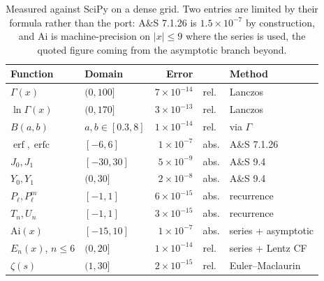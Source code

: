\documentclass[11pt,a4paper]{article}
\theoremstyle{plain}
\theoremstyle{definition}
\begin{document}
\begin{table}[h]
\centering\footnotesize
\begin{tabular}{@{}llrll@{}}
\toprule
\textbf{Function} & \textbf{Domain} & \textbf{Error} & & \textbf{Method}\\
\midrule
$\Gamma(x)$ & $(0,100]$ & $7\times10^{-14}$ & rel. & Lanczos\\
$\ln\Gamma(x)$ & $(0,170]$ & $3\times10^{-13}$ & rel. & Lanczos\\
$B(a,b)$ & $a,b\in[0.3,8]$ & $1\times10^{-14}$ & rel. & via $\Gamma$\\
$\operatorname{erf},\operatorname{erfc}$ & $[-6,6]$ & $1\times10^{-7}$ & abs. & A\&S 7.1.26\\
$J_0,J_1$ & $[-30,30]$ & $5\times10^{-9}$ & abs. & A\&S 9.4\\
$Y_0,Y_1$ & $(0,30]$ & $2\times10^{-8}$ & abs. & A\&S 9.4\\
$P_\ell,P_\ell^m$ & $[-1,1]$ & $6\times10^{-15}$ & abs. & recurrence\\
$T_n,U_n$ & $[-1,1]$ & $3\times10^{-15}$ & abs. & recurrence\\
$\mathrm{Ai}(x)$ & $[-15,10]$ & $1\times10^{-7}$ & abs. & series + asymptotic\\
$E_n(x)$, $n\le6$ & $(0,20]$ & $1\times10^{-14}$ & rel. & series + Lentz CF\\
$\zeta(s)$ & $(1,30]$ & $2\times10^{-15}$ & rel. & Euler--Maclaurin\\
\bottomrule
\end{tabular}
\caption{Measured against SciPy on a dense grid. Two entries are limited by
their formula rather than the port: A\&S 7.1.26 is $1.5\times10^{-7}$ by
construction, and $\mathrm{Ai}$ is machine-precision on $|x|\le9$ where the
series is used, the quoted figure coming from the asymptotic branch beyond.}
\label{tab:accuracy}
\end{table}
\end{document}
